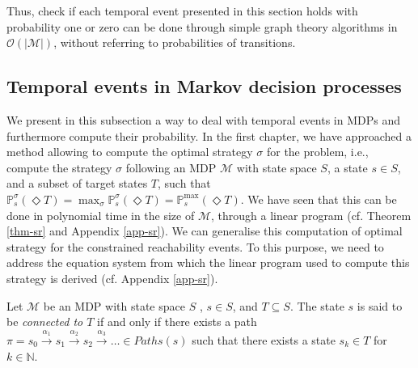 Thus, check if each temporal event presented in this section holds with probability one or zero can be done through simple graph theory algorithms in $\mathcal{O}(|\mathcal{M}|)$, without referring to probabilities of transitions.

\subsection{Temporal events in Markov decision processes}
We present in this subsection a way to deal with temporal events in MDPs and furthermore compute their probability.
In the first chapter, we have approached a method allowing to compute the optimal strategy $\sigma$ for the \SR{} problem, i.e., compute the strategy $\sigma$ following an MDP $\mathcal{M}$ with state space $S$, a state $s \in S$, and a subset of target states $T$, such that $\mathbb{P}_s^\sigma(\Diamond T) = \max_{\sigma} \mathbb{P}^{\sigma}_s(\Diamond T) = \mathbb{P}^{\max}_s(\Diamond T)$.
We have seen that this can be done in polynomial time in the size of $\mathcal{M}$, through a linear program (cf. Theorem \ref{thm-sr} and Appendix \ref{app-sr}).
We can generalise this computation of optimal strategy for the constrained reachability events. To this purpose, we need to address the equation system from which the linear program used to compute this strategy is derived (cf. Appendix \ref{app-sr}).

\begin{definition}\label{connectivity-def}
  Let $\mathcal{M}$ be an MDP with state space $S$ , $s \in S$, and $T \subseteq S$.
  The state $s$ is said to be \textit{connected to $T$} if and only if there exists a path $\pi = s_0\xrightarrow{\alpha_1}s_1\xrightarrow{\alpha_2}s_2 \xrightarrow{\alpha_3} \dots \in Paths(s)$ such that there exists a state $s_k \in T$ for $k \in \mathbb{N}$.
\end{definition}

